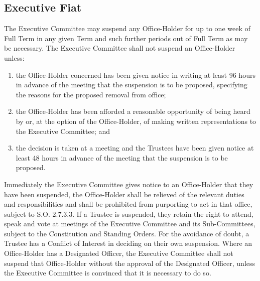 \subsection{Executive Fiat}
\npara The Executive Committee may suspend any Office-Holder for up to one week of Full Term in any given Term and such further periods out of Full Term as may be necessary.  The Executive Committee shall not suspend an Office-Holder unless:
\begin{enumerate}
	\item the Office-Holder concerned has been given notice in writing at least 96 hours in advance of the meeting that the suspension is to be proposed, specifying the reasons for the proposed removal from office;
	\item the Office-Holder has been afforded a reasonable opportunity of being heard by or, at the option of the Office-Holder, of making written representations to the Executive Committee; and
	\item the decision is taken at a meeting and the Trustees have been given notice at least 48 hours in advance of the meeting that the suspension is to be proposed.
\end{enumerate}
\npara Immediately the Executive Committee gives notice to an Office-Holder that they have been suspended, the Office-Holder shall be relieved of the relevant duties and responsibilities and shall be prohibited from purporting to act in that office, subject to S.O. 2.7.3.3.
\npara If a Trustee is suspended, they retain the right to attend, speak and vote at meetings of the Executive Committee and its Sub-Committees, subject to the Constitution and Standing Orders.
\npara For the avoidance of doubt, a Trustee has a Conflict of Interest in deciding on their own suspension.
\npara Where an Office-Holder has a Designated Officer, the Executive Committee shall not suspend that Office-Holder without the approval of the Designated Officer, unless the Executive Committee is convinced that it is necessary to do so.
